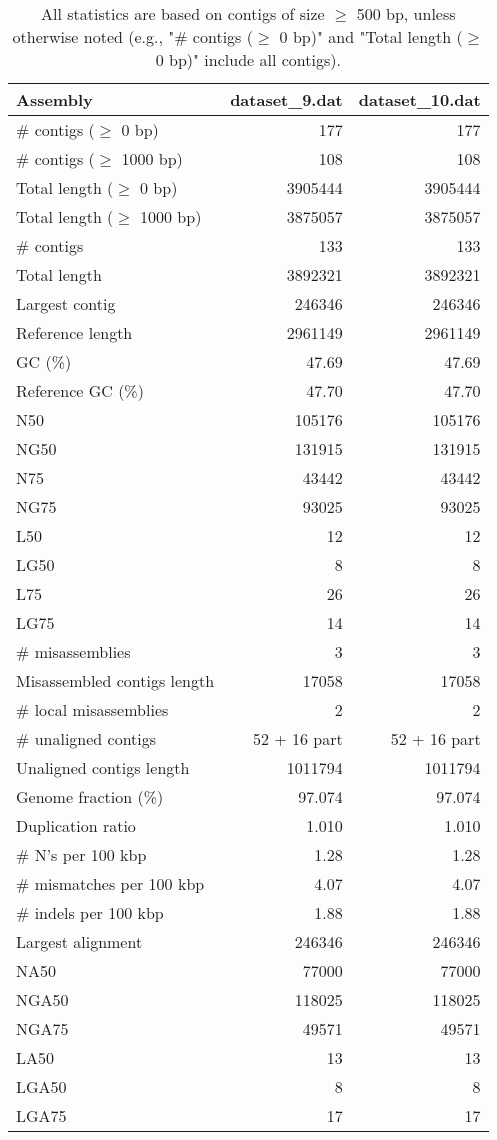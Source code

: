 \documentclass[12pt,a4paper]{article}
\begin{document}
\begin{table}[ht]
\begin{center}
\caption{All statistics are based on contigs of size $\geq$ 500 bp, unless otherwise noted (e.g., "\# contigs ($\geq$ 0 bp)" and "Total length ($\geq$ 0 bp)" include all contigs).}
\begin{tabular}{|l*{2}{|r}|}
\hline
Assembly & dataset\_9.dat & dataset\_10.dat \\ \hline
\# contigs ($\geq$ 0 bp) & 177 & 177 \\ \hline
\# contigs ($\geq$ 1000 bp) & 108 & 108 \\ \hline
Total length ($\geq$ 0 bp) & 3905444 & 3905444 \\ \hline
Total length ($\geq$ 1000 bp) & 3875057 & 3875057 \\ \hline
\# contigs & 133 & 133 \\ \hline
Total length & 3892321 & 3892321 \\ \hline
Largest contig & 246346 & 246346 \\ \hline
Reference length & 2961149 & 2961149 \\ \hline
GC (\%) & 47.69 & 47.69 \\ \hline
Reference GC (\%) & 47.70 & 47.70 \\ \hline
N50 & 105176 & 105176 \\ \hline
NG50 & 131915 & 131915 \\ \hline
N75 & 43442 & 43442 \\ \hline
NG75 & 93025 & 93025 \\ \hline
L50 & 12 & 12 \\ \hline
LG50 & 8 & 8 \\ \hline
L75 & 26 & 26 \\ \hline
LG75 & 14 & 14 \\ \hline
\# misassemblies & 3 & 3 \\ \hline
Misassembled contigs length & 17058 & 17058 \\ \hline
\# local misassemblies & 2 & 2 \\ \hline
\# unaligned contigs & 52 + 16 part & 52 + 16 part \\ \hline
Unaligned contigs length & 1011794 & 1011794 \\ \hline
Genome fraction (\%) & 97.074 & 97.074 \\ \hline
Duplication ratio & 1.010 & 1.010 \\ \hline
\# N's per 100 kbp & 1.28 & 1.28 \\ \hline
\# mismatches per 100 kbp & 4.07 & 4.07 \\ \hline
\# indels per 100 kbp & 1.88 & 1.88 \\ \hline
Largest alignment & 246346 & 246346 \\ \hline
NA50 & 77000 & 77000 \\ \hline
NGA50 & 118025 & 118025 \\ \hline
NGA75 & 49571 & 49571 \\ \hline
LA50 & 13 & 13 \\ \hline
LGA50 & 8 & 8 \\ \hline
LGA75 & 17 & 17 \\ \hline
\end{tabular}
\end{center}
\end{table}
\end{document}
